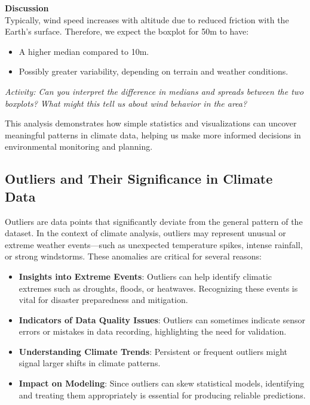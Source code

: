 \textbf{Discussion} \\

Typically, wind speed increases with altitude due to reduced friction with the Earth’s surface. Therefore, we expect the boxplot for 50m to have:
\begin{itemize}
  \item A higher median compared to 10m.
  \item Possibly greater variability, depending on terrain and weather conditions.
\end{itemize}

\textit{Activity: Can you interpret the difference in medians and spreads between the two boxplots? What might this tell us about wind behavior in the area?}

This analysis demonstrates how simple statistics and visualizations can uncover meaningful patterns in climate data, helping us make more informed decisions in environmental monitoring and planning.

\subsection*{Outliers and Their Significance in Climate Data}

Outliers are data points that significantly deviate from the general pattern of the dataset. In the context of climate analysis, outliers may represent unusual or extreme weather events—such as unexpected temperature spikes, intense rainfall, or strong windstorms. These anomalies are critical for several reasons:
\begin{itemize}
  \item \textbf{Insights into Extreme Events}: Outliers can help identify climatic extremes such as droughts, floods, or heatwaves. Recognizing these events is vital for disaster preparedness and mitigation.
  \item \textbf{Indicators of Data Quality Issues}: Outliers can sometimes indicate sensor errors or mistakes in data recording, highlighting the need for validation.
  \item \textbf{Understanding Climate Trends}: Persistent or frequent outliers might signal larger shifts in climate patterns.
  \item \textbf{Impact on Modeling}: Since outliers can skew statistical models, identifying and treating them appropriately is essential for producing reliable predictions.
\end{itemize}

